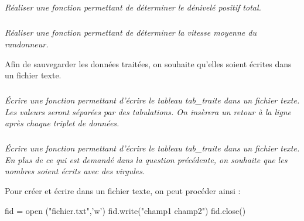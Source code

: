 \documentclass[10pt,oneside]{article}
\begin{document}
\subparagraph{}
\textit{Réaliser une fonction permettant de déterminer le dénivelé positif total.}

\subparagraph{}
\textit{Réaliser une fonction permettant de déterminer la vitesse moyenne du randonneur.}

Afin de sauvegarder les données traitées, on souhaite qu'elles soient écrites dans un fichier texte.

\subparagraph{}
\textit{Écrire une fonction permettant d'écrire le tableau \textsf{tab\_traite} dans un fichier texte. Les valeurs seront séparées par des tabulations. On insèrera un retour à la ligne après chaque triplet de données.}


\subparagraph{}
\textit{Écrire une fonction permettant d'écrire le tableau \textsf{tab\_traite} dans un fichier texte. En plus de ce qui est demandé dans la question précédente, on souhaite que les nombres soient écrits avec des virgules.}

\begin{py}

Pour créer et écrire dans un fichier texte, on peut procéder ainsi :

\begin{python}
fid = open ("fichier.txt",'w')
fid.write("champ1 \tab champ2")
fid.close()
\end{python}

\end{py}
\end{document}
